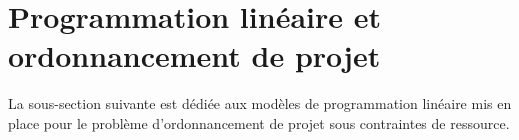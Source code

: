 \chapter{Programmation linéaire et ordonnancement
  de projet}
\label{sec:PLNE_RCPSP}


La sous-section suivante est dédiée aux modèles de programmation linéaire
mis en place pour le problème d'ordonnancement de projet sous
contraintes de ressource. 





